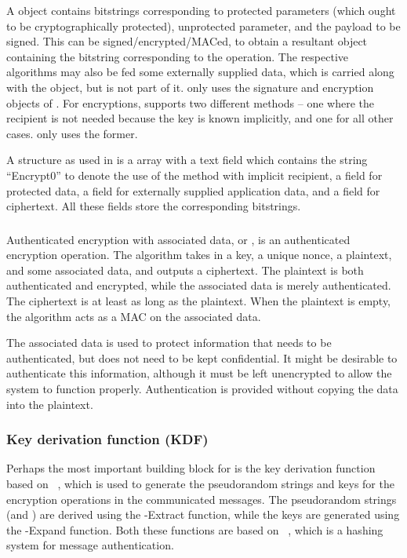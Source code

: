 A \mCose object contains bitstrings corresponding to protected parameters (which ought to be cryptographically protected), unprotected parameter, and the payload to be signed. This can be signed/encrypted/MACed, to obtain a resultant \mCose object containing the bitstring corresponding to the operation. The respective algorithms may also be fed some externally supplied data, which is carried along with the \mCose object, but is not part of it. \mEdhoc only uses the signature and encryption objects of \mCose. For encryptions, \mCose supports two different methods -- one where the recipient is not needed because the key is known implicitly, and one for all other cases. \mEdhoc only uses the former. 

A \mCoseEncrypt structure as used in \mEdhoc is a \mCbor array with a text field which contains the string ``Encrypt0'' to denote the use of the method with implicit recipient, a field for protected data, a field for externally supplied application data, and a field for ciphertext. All these fields store the corresponding bitstrings.

\subsubsection{\mAead}
Authenticated encryption with associated data, or \mAead, is an authenticated encryption operation. The algorithm takes in a key, a unique nonce, a plaintext, and some associated data, and outputs a ciphertext. The plaintext is both authenticated and encrypted, while the associated data is merely authenticated. The ciphertext is at least as long as the plaintext. When the plaintext is empty, the \mAead algorithm acts as a MAC on the associated data. 

The associated data is used to protect information that needs to be authenticated, but does not need to be kept confidential. It might be desirable to authenticate this information, although it must be left unencrypted to allow the system to function properly. Authentication is provided without copying the data into the plaintext.

\subsubsection{Key derivation function (KDF)}
Perhaps the most important building block for \mEdhoc is the key derivation function based on \mHkdf~\cite{rfc5869}, which is used to generate the pseudorandom strings and keys for the encryption operations in the communicated messages. The pseudorandom strings (\mPRKtwo and \mPRKthree) are derived using the \mHkdf-Extract function, while the keys are generated using the \mHkdf-Expand function. Both these functions are based on \mHmac~\cite{rfc2104}, which is a hashing system for message authentication.

